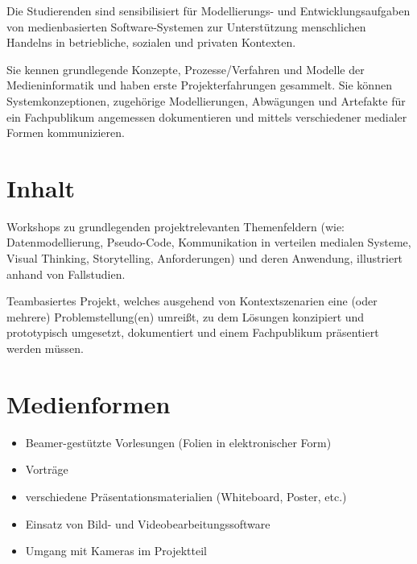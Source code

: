 Die Studierenden sind sensibilisiert für Modellierungs- und
Entwicklungsaufgaben von medienbasierten Software-Systemen zur
Unterstützung menschlichen Handelns in betriebliche, sozialen und
privaten Kontexten.

Sie kennen grundlegende Konzepte, Prozesse/Verfahren und Modelle der
Medieninformatik und haben erste Projekterfahrungen gesammelt. Sie
können Systemkonzeptionen, zugehörige Modellierungen, Abwägungen und
Artefakte für ein Fachpublikum angemessen dokumentieren und mittels
verschiedener medialer Formen kommunizieren.

\hypertarget{inhaltpathlabelmi-2017modulbeschreibungen-bachelorba_einfhrungindiemedieninformatik}{%
\section*{Inhalt\label{/mi-2017/modulbeschreibungen-bachelor/BA_EinfhrungindieMedieninformatik}}\label{inhaltpathlabelmi-2017modulbeschreibungen-bachelorba_einfhrungindiemedieninformatik}}

Workshops zu grundlegenden projektrelevanten Themenfeldern (wie:
Datenmodellierung, Pseudo-Code, Kommunikation in verteilen medialen
Systeme, Visual Thinking, Storytelling, Anforderungen) und deren
Anwendung, illustriert anhand von Fallstudien.

Teambasiertes Projekt, welches ausgehend von Kontextszenarien eine (oder
mehrere) Problemstellung(en) umreißt, zu dem Lösungen konzipiert und
prototypisch umgesetzt, dokumentiert und einem Fachpublikum präsentiert
werden müssen.

\hypertarget{medienformenpathlabelmi-2017modulbeschreibungen-bachelorba_einfhrungindiemedieninformatik}{%
\section*{Medienformen\label{/mi-2017/modulbeschreibungen-bachelor/BA_EinfhrungindieMedieninformatik}}\label{medienformenpathlabelmi-2017modulbeschreibungen-bachelorba_einfhrungindiemedieninformatik}}

\begin{itemize}
\tightlist
\item
  Beamer-gestützte Vorlesungen (Folien in elektronischer Form)
\item
  Vorträge
\item
  verschiedene Präsentationsmaterialien (Whiteboard, Poster, etc.)
\item
  Einsatz von Bild- und Videobearbeitungssoftware
\item
  Umgang mit Kameras im Projektteil
\end{itemize}

